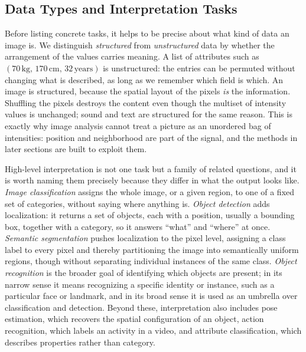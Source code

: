 \subsection{Data Types and Interpretation Tasks}

Before listing concrete tasks, it helps to be precise about what kind of data an
image is. We distinguish \emph{structured} from \emph{unstructured} data by
whether the arrangement of the values carries meaning. A list of attributes such
as $(70\,\mathrm{kg},\,170\,\mathrm{cm},\,32\,\mathrm{years})$ is unstructured:
the entries can be permuted without changing what is described, as long as we
remember which field is which. An image is structured, because the spatial
layout of the pixels \emph{is} the information. Shuffling the pixels destroys the
content even though the multiset of intensity values is unchanged; sound and text
are structured for the same reason. This is exactly why image analysis cannot
treat a picture as an unordered bag of intensities: position and neighborhood are
part of the signal, and the methods in later sections are built to exploit them.

High-level interpretation is not one task but a family of related questions, and
it is worth naming them precisely because they differ in what the output looks
like. \emph{Image classification} assigns the whole image, or a given region, to
one of a fixed set of categories, without saying where anything is.
\emph{Object detection} adds localization: it returns a set of objects, each with
a position, usually a bounding box, together with a category, so it answers
``what'' and ``where'' at once. \emph{Semantic segmentation} pushes localization
to the pixel level, assigning a class label to every pixel and thereby
partitioning the image into semantically uniform regions, though without
separating individual instances of the same class. \emph{Object recognition} is
the broader goal of identifying which objects are present; in its narrow sense it
means recognizing a specific identity or instance, such as a particular face or
landmark, and in its broad sense it is used as an umbrella over classification and
detection. Beyond these, interpretation also includes pose estimation, which
recovers the spatial configuration of an object, action recognition, which labels
an activity in a video, and attribute classification, which describes properties
rather than category.

